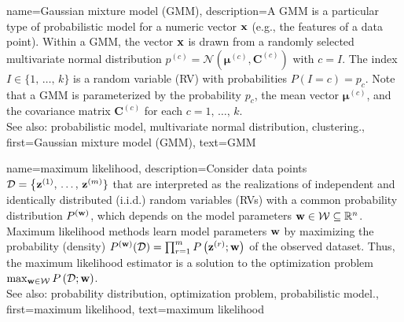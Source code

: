 {
{name={Gaussian mixture model (GMM)}, 
	description={A GMM 
		is a particular type of probabilistic model for a numeric vector ${\bf x}$ (e.g., 
		the features of a data point). Within a GMM, the vector ${\bf x}$ 
		is drawn from a randomly selected multivariate normal distribution 
		$p^{(c)} = \mathcal{N}\left({\bm \mu}^{(c)},\mathbf{C}^{(c)}\right)$ with 
		$c = I$. The index $I \in \{1, \,\ldots, \,k\}$ is a random variable (RV) with 
		probabilities $P\left(I=c\right) = p_{c}$.
	     	Note that a GMM is parameterized by the probability $p_{c}$, the 
		mean vector ${\bm \mu}^{(c)}$, and the covariance matrix $\mathbf{C}^{(c)}$ 
		for each $c=1, \,\ldots, \,k$. 
				\\
		See also: probabilistic model, multivariate normal distribution, clustering.},
	first={Gaussian mixture model (GMM)},
	text={GMM} 
}
 
{name={maximum likelihood}, 
	description={Consider data points 
	$\mathcal{D}=\big\{ {\bf z}^{(1)}, \,\ldots, \,{\bf z}^{(m)} \}$ 
	that are interpreted as the realizations of independent and identically distributed (i.i.d.) random variables (RVs) 
	with a common probability distribution $P^{({\bf w})}$, which depends 
	on the model parameters ${\bf w} \in \mathcal{W} \subseteq \mathbb{R}^{n}$. 
		Maximum likelihood methods learn model parameters ${\bf w}$ by maximizing 
		the probability (density) $P^{({\bf w})}(\mathcal{D}) = \prod_{r=1}^{m} P\left({\bf z}^{(r)}; {\bf w}\right)$ 
		of the observed dataset. Thus, the maximum likelihood estimator is a 
		solution to the optimization problem $\max_{{\bf w} \in \mathcal{W}} P\left(\mathcal{D}; {\bf w}\right)$.
				\\
		See also: probability distribution, optimization problem, probabilistic model.},
	first={maximum likelihood},
	text={maximum likelihood}
}


}
